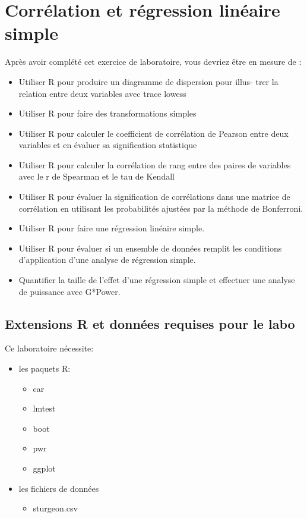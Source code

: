 \documentclass[12pt,]{book}
\providecommand{\tightlist}{%
  \setlength{\itemsep}{0pt}\setlength{\parskip}{0pt}}
\begin{document}
\hypertarget{corruxe9lation-et-ruxe9gression-linuxe9aire-simple}{%
\chapter{Corrélation et régression linéaire simple}\label{corruxe9lation-et-ruxe9gression-linuxe9aire-simple}}

Après avoir complété cet exercice de laboratoire, vous devriez être en mesure de :

\begin{itemize}
\tightlist
\item
  Utiliser R pour produire un diagramme de dispersion pour illus-
  trer la relation entre deux variables avec trace lowess
\item
  Utiliser R pour faire des transformations simples
\item
  Utiliser R pour calculer le coefficient de corrélation de Pearson entre deux variables et en évaluer sa signification statistique
\item
  Utiliser R pour calculer la corrélation de rang entre des paires de variables avec le r de Spearman et le tau de Kendall
\item
  Utiliser R pour évaluer la signification de corrélations dans une matrice de corrélation en utilisant les probabilités ajustées par la méthode de Bonferroni.
\item
  Utiliser R pour faire une régression linéaire simple.
\item
  Utiliser R pour évaluer si un ensemble de données remplit les conditions d'application d'une analyse de régression simple.
\item
  Quantifier la taille de l'effet d'une régression simple et effectuer une analyse de puissance avec G*Power.
\end{itemize}

\hypertarget{set-lm}{%
\section{Extensions R et données requises pour le labo}\label{set-lm}}

Ce laboratoire nécessite:

\begin{itemize}
\tightlist
\item
  les paquets R:

  \begin{itemize}
  \tightlist
  \item
    car
  \item
    lmtest
  \item
    boot
  \item
    pwr
  \item
    ggplot
  \end{itemize}
\item
  les fichiers de données

  \begin{itemize}
  \tightlist
  \item
    sturgeon.csv
  \end{itemize}
\end{itemize}
\end{document}
